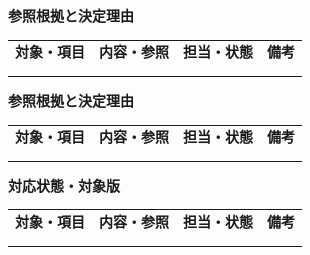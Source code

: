 \documentclass[11pt,a4paper]{article}
\begin{document}
\par{}\noindent\textbf{参照根拠と決定理由}\par\vspace{1mm}
{\fontsize{8.5}{13}\selectfont
\begin{tabularx}{\linewidth}{@{}XXXX@{}}
\textbf{対象・項目} & \textbf{内容・参照} & \textbf{担当・状態} & \textbf{備考}\\[2mm]
\strut & \strut & \strut & \strut\\[5mm]
\strut & \strut & \strut & \strut\\[5mm]
\end{tabularx}
}\vspace{2mm}\par
{}
\par{}\noindent\textbf{参照根拠と決定理由}\par\vspace{1mm}
{\fontsize{8.5}{13}\selectfont
\begin{tabularx}{\linewidth}{@{}XXXX@{}}
\textbf{対象・項目} & \textbf{内容・参照} & \textbf{担当・状態} & \textbf{備考}\\[2mm]
\strut & \strut & \strut & \strut\\[5mm]
\strut & \strut & \strut & \strut\\[5mm]
\end{tabularx}
}\vspace{2mm}\par
{}
\par{}\noindent\textbf{対応状態・対象版}\par\vspace{1mm}
{\fontsize{8.5}{13}\selectfont
\begin{tabularx}{\linewidth}{@{}XXXX@{}}
\textbf{対象・項目} & \textbf{内容・参照} & \textbf{担当・状態} & \textbf{備考}\\[2mm]
\strut & \strut & \strut & \strut\\[5mm]
\strut & \strut & \strut & \strut\\[5mm]
\end{tabularx}
}\vspace{2mm}\par
\end{document}
